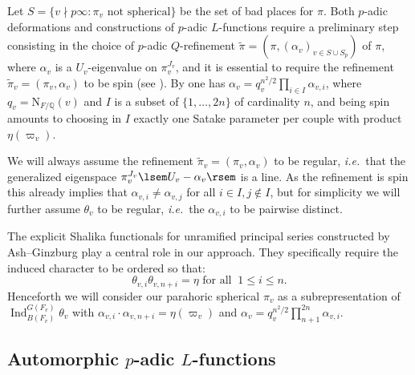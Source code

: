 \documentclass{amsart}
\theoremstyle{definition}
\newcommand{\A}{\mathbb{A}}
\newcommand{\Q}{\mathbb{Q}}
\newcommand{\cO}{\mathcal{O}}
\newcommand{\Ind}{\operatorname{Ind}}
\newcommand{\Cl}{\mathscr{C}\!\ell_F^+}
\begin{document}
{Let $S=\{v\nmid p\infty: \pi_v\text{ not spherical}\}$  be the set of bad places for $\pi$. 
Both  $p$-adic deformations and  constructions of $p$-adic $L$-functions  require a preliminary step consisting in the choice of  $p$-adic $Q$-refinement $\widetilde{\pi}=\left(\pi,(\alpha_v)_{v\in S\cup S_p}\right)$ of $\pi$, where $\alpha_v$ is a $U_v$-eigenvalue on $\pi_v^{J_v}$, and it  is essential to require the refinement $\widetilde{\pi}_v=(\pi_v,\alpha_v)$ to be spin (see \cite[\S6]{BDGJW}). By \cite{DJR} one has 
$\alpha_v=q_v^{n^2/2}\prod\limits_{i\in I}\alpha_{v,i}$, where $q_v=\mathrm{N}_{F/\Q}(v)$ and 
$I$ is a subset of  $\{1,\dots, 2n\}$  of cardinality $n$, and being spin amounts to choosing in $I$ exactly one 
Satake parameter per couple with product $\eta(\varpi_v)$. 

We will always assume the refinement $\widetilde{\pi}_v=(\pi_v,\alpha_v)$  to be regular, {\it i.e.}~that  the generalized eigenspace $\pi_v^{J_v} \lsem U_v-\alpha_v\rsem$ is a line. As the refinement is spin this already implies that $\alpha_{v,i}\ne \alpha_{v,j}$ for all $i\in I, j\notin I$, but for simplicity we will 
further assume $\theta_v$ to be regular,  {\it i.e.}~the $\alpha_{v,i}$ to be pairwise distinct. 

The explicit Shalika functionals for unramified principal series  constructed by Ash--Ginzburg \cite{AG}  play a central role in our approach. 
They specifically require the induced character to be ordered so that: 
\[\theta_{v,i}\theta_{v,n+i}=\eta \text{ for all }~ 1 \leqslant  i \leqslant n.  \]
Henceforth we will consider our parahoric spherical $\pi_v$ as a subrepresentation of $\Ind_{B(F_v)}^{G(F_v)}\theta_v$ with 
$\alpha_{v,i}\cdot \alpha_{v,n+i}=\eta(\varpi_v)$ and $\alpha_{v}=q_v^{n^2/2}\prod\limits_{n+1}^{2n}\alpha_{v,i}$. 





\subsection{Automorphic $p$-adic $L$-functions}~ \label{sec:padicL} 





}
\end{document}

